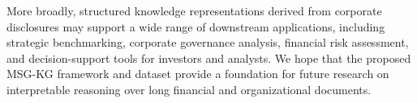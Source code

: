 \documentclass[11pt]{article}
\begin{document}
More broadly, structured knowledge representations derived from corporate disclosures may support a wide range of downstream applications, including strategic benchmarking, corporate governance analysis, financial risk assessment, and decision-support tools for investors and analysts. We hope that the proposed MSG-KG framework and dataset provide a foundation for future research on interpretable reasoning over long financial and organizational documents.







\end{document}
